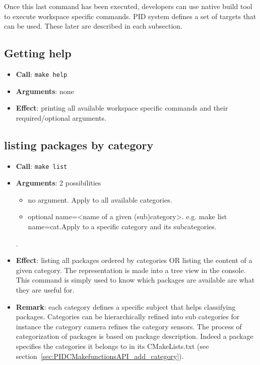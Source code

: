 \documentclass[12pt,a4paper]{article}
\begin{document}
Once this last command has been executed, developers can use native build tool to execute workspace specific commands. PID system defines a set of targets that can be used. These later are described in each subsection.

\subsection{Getting help}
\begin{itemize}
\item \textbf{Call}: \texttt{make help}
\item \textbf{Arguments}: none
\item \textbf{Effect}: printing all available workspace specific commands and their required/optional arguments.
\end{itemize}

\subsection{listing packages by category}
\begin{itemize}
\item \textbf{Call}: \texttt{make list}
\item \textbf{Arguments}: 2 possibilities
\begin{itemize}
\item no argument. Apply to all available categories.
\item {optional} name=<name of a given (sub)category>. e.g. make list name=cat.Apply to a specific category and its subcategories.
\end{itemize}. 
\item \textbf{Effect}: listing all packages ordered by categories OR listing the content of a given category. The representation is made into a tree view in the console. This command is simply used to know which packages are available are what they are useful for.
\item \textbf{Remark}: each category defines a specific subject that helps classifying packages. Categories can be hierarchically refined into sub categories for instance the category camera refines the category sensors. The process of categorization of packages is based on package description. Indeed a package specifies the categories it belongs to in its CMakeLists.txt (see section~\ref{sec:PIDCMakefunctionsAPI_add_category}).
\end{itemize}
\end{document}
